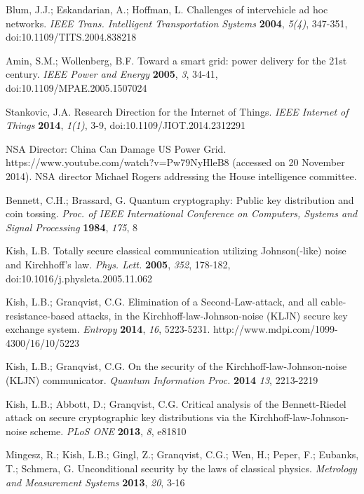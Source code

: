 \documentclass[a4paper,12pt,pdftex]{article}
\begin{document}
\begin{thebibliography}{99} 


Blum, J.J.; Eskandarian, A.; Hoffman, L. Challenges of intervehicle ad hoc networks. {\em IEEE Trans. Intelligent Transportation Systems} {\bf 2004}, {\em 5(4)}, 347-351, doi:10.1109/TITS.2004.838218

Amin, S.M.; Wollenberg, B.F. Toward a smart grid: power delivery for the 21st century. {\em IEEE Power and Energy} {\bf 2005}, {\em 3}, 34-41, doi:10.1109/MPAE.2005.1507024

Stankovic, J.A. Research Direction for the Internet of Things. {\em IEEE Internet of Things} {\bf 2014}, {\em 1(1)}, 3-9, doi:10.1109/JIOT.2014.2312291


NSA Director: China Can Damage US Power Grid. https://www.youtube.com/watch?v=Pw79NyHleB8 (accessed on 20 November 2014). NSA director Michael Rogers addressing the House intelligence committee.

Bennett, C.H.; Brassard, G. Quantum cryptography: Public key distribution and coin tossing. {\em Proc. of IEEE International Conference on Computers, Systems and Signal Processing} {\bf 1984}, {\em 175}, 8


Kish, L.B. Totally secure classical communication utilizing Johnson(-like) noise and Kirchhoff's law. {\em Phys. Lett.} {\bf 2005}, {\em 352}, 178-182, doi:10.1016/j.physleta.2005.11.062

Kish, L.B.; Granqvist, C.G. Elimination of a Second-Law-attack, and all cable-resistance-based attacks, in the Kirchhoff-law-Johnson-noise (KLJN) secure key exchange system. {\em Entropy} {\bf 2014}, {\em 16}, 5223-5231. http://www.mdpi.com/1099-4300/16/10/5223

Kish, L.B.; Granqvist, C.G. On the security of the Kirchhoff-law-Johnson-noise (KLJN) communicator. {\em Quantum Information Proc.} {\bf 2014} {\em 13}, 2213-2219

Kish, L.B.; Abbott, D.; Granqvist, C.G. Critical analysis of the Bennett-Riedel attack on secure cryptographic key distributions via the Kirchhoff-law-Johnson-noise scheme. {\em PLoS ONE} {\bf 2013}, {\em 8}, e81810


Mingesz, R.; Kish, L.B.; Gingl, Z.; Granqvist, C.G.; Wen, H.; Peper, F.; Eubanks, T.; Schmera, G. Unconditional security by the laws of classical physics. {\em Metrology and Measurement Systems} {\bf 2013}, {\em 20}, 3-16


\end{thebibliography}
\end{document}

